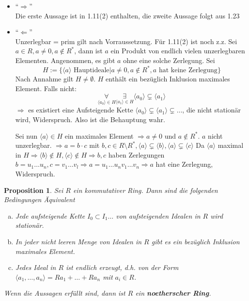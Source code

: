 \documentclass{article}
\newtheorem{proposition}[thm]{Proposition}
\begin{document}
\begin{itemize}
    \item ``$\Rightarrow$''\\
        Die erste Aussage ist in 1.11(2) enthalten,
        die zweite Aussage folgt aus 1.23
    \item ``$\Leftarrow$''\\
        Unzerlegbar = prim gilt nach Vorraussetzung.
        Für 1.11(2) ist noch z.z. Sei $a\in R,a\neq 0,
        a\notin R^*$, dann ist $a$ ein Produkt von endlich
        vielen unzerlegbaren Elementen. Angenommen, es gibt
        $a$ ohne eine solche Zerlegung. Sei
        \begin{equation*}
            H:=\{\langle a\rangle\text{ Hauptideale}|a\neq 0,
            a\notin R^*,a\text{ hat keine Zerlegung}\}
        \end{equation*}
        Nach Annahme gilt $H\neq\emptyset$. $H$ enthält
        ein bezüglich Inklusion maximales Element.
        Falls nicht:
        \begin{equation*}
            \underset{\langle a_0\rangle\in H}\forall
            \underset{\langle a_1\rangle\in H}\exists
            \langle a_0\rangle\subsetneq\langle a_1\rangle
        \end{equation*}
        $\Rightarrow$ es existiert eine Aufsteigende Kette
        $\langle a_0\rangle\subsetneq\langle a_1\rangle
        \subsetneq\hdots$, die nicht stationär wird,
        Widerspruch. Also ist die Behauptung wahr.

        Sei nun $\langle a\rangle\in H$ ein maximales
        Element $\Rightarrow a\neq 0$ und $a\notin R^*$.
        $a$ nicht unzerlegbar.
        $\Rightarrow a=b\cdot c$ mit $b,c\in R\setminus R^*,
        \langle a\rangle\subsetneq\langle b\rangle,
        \langle a\rangle\subsetneq\langle c\rangle$
        Da $\langle a\rangle$ maximal in $H\Rightarrow
        \langle b\rangle\notin H,\langle c\rangle\notin H
        \Rightarrow b,c$ haben Zerlegungen $b=u_1\hdots u_n,
        c=v_1\hdots v_l\Rightarrow a=u_1\hdots u_nv_1\hdots
        v_n\Rightarrow a$ hat eine Zerlegung, Widerspruch.
\end{itemize}
\begin{proposition}
    Sei $R$ ein kommutativer Ring. Dann sind die folgenden
    Bedingungen Äquivalent
    \begin{enumerate}[(a)]
        \item
            Jede aufsteigende Kette $I_0\subset I_1\hdots$
            von aufsteigenden Idealen in $R$ wird stationär.
        \item
            In jeder nicht leeren Menge von Idealen in $R$
            gibt es ein bezüglich Inklusion maximales
            Element.
        \item
            Jedes Ideal in $R$ ist endlich erzeugt, d.h.
            von der Form $\langle a_1,\hdots,a_n\rangle
            =Ra_1+\hdots+Ra_n$ mit $a_i\in R$.
    \end{enumerate}
    Wenn die Aussagen erfüllt sind, dann ist $R$ ein
    \textbf{noetherscher Ring}.
\end{proposition}
\end{document}
